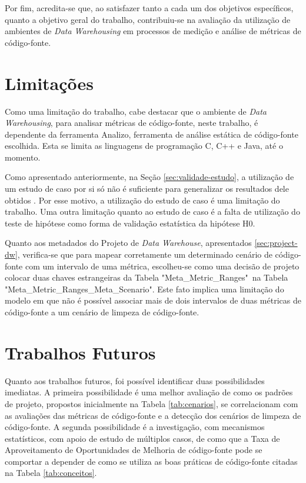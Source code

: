 Por fim, acredita-se que, ao satisfazer tanto a cada um dos objetivos específicos, quanto a objetivo geral do trabalho, contribuiu-se na avaliação da utilização de ambientes de \textit{Data Warehousing} em processos de medição e análise de métricas de código-fonte. 

\section{Limitações}

Como uma limitação do trabalho, cabe destacar que o ambiente de \textit{Data Warehousing}, para analisar métricas de código-fonte, neste trabalho, é dependente da ferramenta Analizo, ferramenta de análise estática de código-fonte escolhida. Esta se limita as linguagens de programação C, C++ e Java, até o momento.

Como apresentado anteriormente, na Seção \ref{sec:validade-estudo}, a utilização de um estudo de caso por si só não é suficiente para generalizar os resultados dele obtidos \cite{yin2011applications}. Por esse motivo, a utilização do estudo de caso é uma limitação do trabalho. Uma outra limitação quanto ao estudo de caso é a falta de utilização do teste de hipótese como forma de validação estatística da hipótese H0.

Quanto aos metadados do Projeto de \textit{Data Warehouse}, apresentados \ref{sec:project-dw}, verifica-se que para mapear corretamente um determinado cenário de código-fonte com um intervalo de uma métrica, escolheu-se como uma decisão de projeto colocar duas chaves estrangeiras da Tabela "Meta\_Metric\_Ranges"~na Tabela "Meta\_Metric\_Ranges\_Meta\_Scenario". Este fato implica uma limitação do modelo em que não é possível associar mais de dois intervalos de duas métricas de código-fonte a um cenário de limpeza de código-fonte.  

\section{Trabalhos Futuros}

Quanto aos trabalhos futuros, foi possível identificar duas possibilidades imediatas. A primeira possibilidade é uma melhor avaliação de como os padrões de projeto, propostos inicialmente na Tabela \ref{tab:cenarios}, se correlacionam com as avaliações das métricas de código-fonte e a detecção dos cenários de limpeza de código-fonte. A segunda possibilidade é a investigação, com mecanismos estatísticos, com apoio de estudo de múltiplos casos, de como que a Taxa de Aproveitamento de Oportunidades de Melhoria de código-fonte pode se comportar a depender de como se utiliza as boas práticas de código-fonte citadas na Tabela \ref{tab:conceitos}.